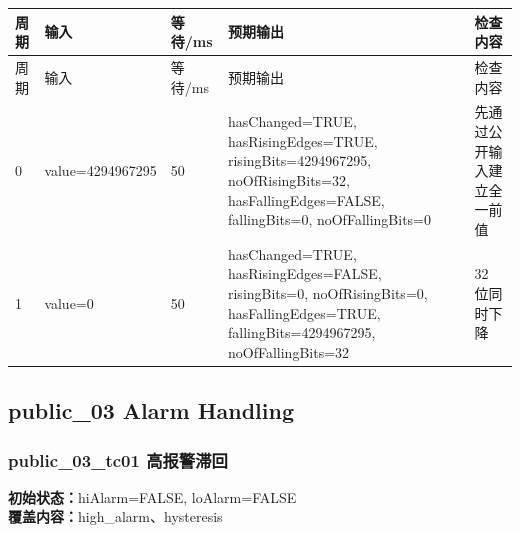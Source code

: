 \begin{longtable}{L{1.0cm}L{4.7cm}L{1.4cm}L{4.0cm}L{2.1cm}}

\toprule

周期 & 输入 & 等待/ms & 预期输出 & 检查内容\\

\midrule

\endfirsthead

\toprule

周期 & 输入 & 等待/ms & 预期输出 & 检查内容\\

\midrule

\endhead

0 & value=4294967295 & 50 & hasChanged=TRUE, hasRisingEdges=TRUE, risingBits=4294967295, noOfRisingBits=32, hasFallingEdges=FALSE, fallingBits=0, noOfFallingBits=0 & 先通过公开输入建立全一前值\\

1 & value=0 & 50 & hasChanged=TRUE, hasRisingEdges=FALSE, risingBits=0, noOfRisingBits=0, hasFallingEdges=TRUE, fallingBits=4294967295, noOfFallingBits=32 & 32 位同时下降\\

\bottomrule

\end{longtable}

\subsection{{\ttfamily public\_03} Alarm Handling}

\subsubsection{{\ttfamily public\_03\_tc01} 高报警滞回}

\noindent\textbf{初始状态：}hiAlarm=FALSE, loAlarm=FALSE\\

\textbf{覆盖内容：}high\_alarm、hysteresis

